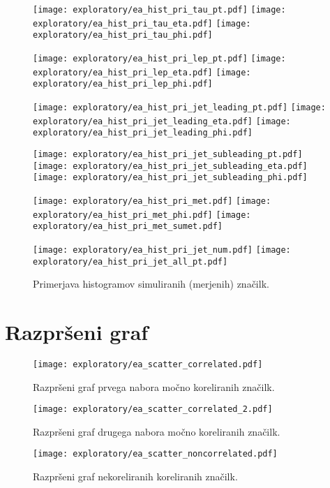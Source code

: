 \begin{figure}[ht]
	\label{hist_prim}

	\texttt{[image: exploratory/ea\_hist\_pri\_tau\_pt.pdf]}	
	\texttt{[image: exploratory/ea\_hist\_pri\_tau\_eta.pdf]}	
	\texttt{[image: exploratory/ea\_hist\_pri\_tau\_phi.pdf]}	
	
	\texttt{[image: exploratory/ea\_hist\_pri\_lep\_pt.pdf]}	
	\texttt{[image: exploratory/ea\_hist\_pri\_lep\_eta.pdf]}	
	\texttt{[image: exploratory/ea\_hist\_pri\_lep\_phi.pdf]}	
	
	\texttt{[image: exploratory/ea\_hist\_pri\_jet\_leading\_pt.pdf]}	
	\texttt{[image: exploratory/ea\_hist\_pri\_jet\_leading\_eta.pdf]}	
	\texttt{[image: exploratory/ea\_hist\_pri\_jet\_leading\_phi.pdf]}	
	
	\texttt{[image: exploratory/ea\_hist\_pri\_jet\_subleading\_pt.pdf]}	
	\texttt{[image: exploratory/ea\_hist\_pri\_jet\_subleading\_eta.pdf]}	
	\texttt{[image: exploratory/ea\_hist\_pri\_jet\_subleading\_phi.pdf]}
	
	
	\texttt{[image: exploratory/ea\_hist\_pri\_met.pdf]}	
	\texttt{[image: exploratory/ea\_hist\_pri\_met\_phi.pdf]}	
	\texttt{[image: exploratory/ea\_hist\_pri\_met\_sumet.pdf]}	
	
	\texttt{[image: exploratory/ea\_hist\_pri\_jet\_num.pdf]}	
	\texttt{[image: exploratory/ea\_hist\_pri\_jet\_all\_pt.pdf]}	

	\caption{Primerjava histogramov simuliranih (merjenih) značilk.}	
	\label{sl:histogram_izmerjene}		
	
\end{figure}

\clearpage

\section{Razpršeni graf}


\begin{figure}[ht]
	\texttt{[image: exploratory/ea\_scatter\_correlated.pdf]}	
	\caption{Razpršeni graf prvega nabora močno koreliranih značilk.}
	\label{sl:scatter_corr}
\end{figure}

\begin{figure}[ht]	
	\texttt{[image: exploratory/ea\_scatter\_correlated\_2.pdf]}	
	\caption{Razpršeni graf drugega nabora močno koreliranih značilk.}
	\label{sl:scatter_corr2}
\end{figure}

\begin{figure}[ht]
	\texttt{[image: exploratory/ea\_scatter\_noncorrelated.pdf]}	
	\caption{Razpršeni graf nekoreliranih koreliranih značilk.}
	\label{sl:scatter_noncorr}			
\end{figure}



